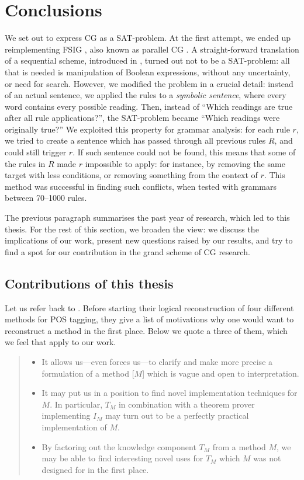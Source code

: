 \chapter{Conclusions}
\label{chapterConclusions}

We set out to express CG as a SAT-problem. 
At the first attempt, we ended up reimplementing FSIG \cite{koskenniemi90}, 
also known as parallel CG \cite{koskenniemi97}. 
A straight-forward translation of a sequential scheme, introduced in \cite{lager_nivre01}, 
turned out not to be a SAT-problem: all that is needed is manipulation of Boolean expressions, 
without any uncertainty, or need for search. 
However, we modified the problem in a crucial detail: instead of an actual sentence, 
we applied the rules to a {\em symbolic sentence}, where every word contains every possible reading.
Then, instead of ``Which readings are true after all rule applications?'', the SAT-problem became ``Which readings were originally true?''
We exploited this property for grammar analysis: for each rule $r$, we tried to create a sentence 
which has passed through all previous rules $R$, and could still trigger $r$.
If such sentence could not be found, this means that some of the rules in $R$ made $r$ impossible to apply: for instance, by removing the same target with less conditions, or removing something from the context of $r$.
This method was successful in finding such conflicts, when tested with grammars between 70--1000 rules.

The previous paragraph summarises the past year of research, which led to this thesis. 
For the rest of this section, we broaden the view: we discuss the implications of our work, 
present new questions raised by our results, and try to find a spot for our contribution 
in the grand scheme of CG research.


\section{Contributions of this thesis}

Let us refer back to \cite{lager_nivre01}. 
Before starting their logical reconstruction of four different methods for POS tagging,
they give a list of motivations why one would want to reconstruct a method in the first place.
Below we quote a three of them, which we feel that apply to our work.

\begin{quote}
\begin{itemize}
\item It allows us---even forces us---to clarify and make more precise a formulation of a method [$M$] which is vague and open to interpretation.
\item It may put us in a position to find novel implementation techniques for $M$. 
In particular, $T_M$ in combination with a theorem prover implementing $I_M$ may turn out to be a perfectly practical implementation of $M$.
\item By factoring out the knowledge component $T_M$ from a method $M$, 
we may be able to find interesting novel uses for $T_M$ which $M$ was not designed for in the first place.
\end{itemize}
\end{quote}


